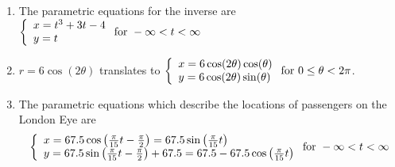 \begin{enumerate} 
\setcounter{enumi}{\value{HW}}

\item  The parametric equations for the inverse are ${\displaystyle \left\{ \begin{array}{l} x = t^3+3t-4 \\ y = t  \end{array} \right. \vspace{.25in} \mbox{for } -\infty < t < \infty}$

\item  $r = 6\cos(2\theta)$ translates to  ${\displaystyle \left\{ \begin{array}{l} x = 6\cos(2\theta)\cos(\theta) \\ y = 6\cos(2\theta)\sin(\theta)  \end{array} \right. \vspace{.25in} \mbox{for } 0 \leq \theta <  2\pi}$.

\item The parametric equations which describe the locations of passengers on the London Eye are \[ \left\{ \begin{array}{l} x = 67.5 \cos\left(\frac{\pi}{15} t - \frac{\pi}{2} \right) = 67.5 \sin\left(\frac{\pi}{15} t \right) \\ y = 67.5 \sin\left(\frac{\pi}{15} t - \frac{\pi}{2} \right) + 67.5 = 67.5 - 67.5 \cos\left(\frac{\pi}{15} t \right)   \end{array} \right. \vspace{.25in} \mbox{for } -\infty < t < \infty \]


\setcounter{HW}{\value{enumi}}
\end{enumerate}



